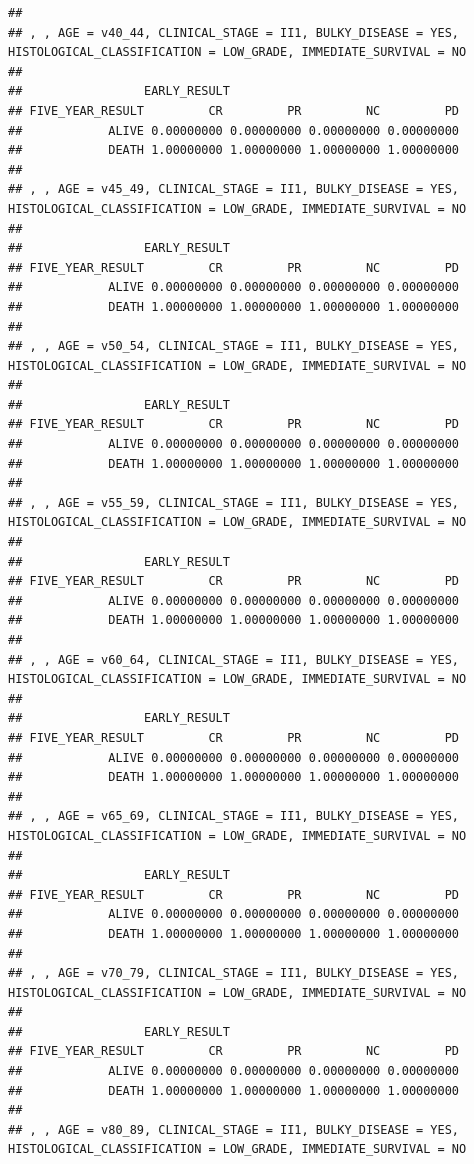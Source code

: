 \documentclass[]{article}
\begin{document}
\begin{verbatim}
## 
## , , AGE = v40_44, CLINICAL_STAGE = II1, BULKY_DISEASE = YES, HISTOLOGICAL_CLASSIFICATION = LOW_GRADE, IMMEDIATE_SURVIVAL = NO
## 
##                 EARLY_RESULT
## FIVE_YEAR_RESULT         CR         PR         NC         PD
##            ALIVE 0.00000000 0.00000000 0.00000000 0.00000000
##            DEATH 1.00000000 1.00000000 1.00000000 1.00000000
## 
## , , AGE = v45_49, CLINICAL_STAGE = II1, BULKY_DISEASE = YES, HISTOLOGICAL_CLASSIFICATION = LOW_GRADE, IMMEDIATE_SURVIVAL = NO
## 
##                 EARLY_RESULT
## FIVE_YEAR_RESULT         CR         PR         NC         PD
##            ALIVE 0.00000000 0.00000000 0.00000000 0.00000000
##            DEATH 1.00000000 1.00000000 1.00000000 1.00000000
## 
## , , AGE = v50_54, CLINICAL_STAGE = II1, BULKY_DISEASE = YES, HISTOLOGICAL_CLASSIFICATION = LOW_GRADE, IMMEDIATE_SURVIVAL = NO
## 
##                 EARLY_RESULT
## FIVE_YEAR_RESULT         CR         PR         NC         PD
##            ALIVE 0.00000000 0.00000000 0.00000000 0.00000000
##            DEATH 1.00000000 1.00000000 1.00000000 1.00000000
## 
## , , AGE = v55_59, CLINICAL_STAGE = II1, BULKY_DISEASE = YES, HISTOLOGICAL_CLASSIFICATION = LOW_GRADE, IMMEDIATE_SURVIVAL = NO
## 
##                 EARLY_RESULT
## FIVE_YEAR_RESULT         CR         PR         NC         PD
##            ALIVE 0.00000000 0.00000000 0.00000000 0.00000000
##            DEATH 1.00000000 1.00000000 1.00000000 1.00000000
## 
## , , AGE = v60_64, CLINICAL_STAGE = II1, BULKY_DISEASE = YES, HISTOLOGICAL_CLASSIFICATION = LOW_GRADE, IMMEDIATE_SURVIVAL = NO
## 
##                 EARLY_RESULT
## FIVE_YEAR_RESULT         CR         PR         NC         PD
##            ALIVE 0.00000000 0.00000000 0.00000000 0.00000000
##            DEATH 1.00000000 1.00000000 1.00000000 1.00000000
## 
## , , AGE = v65_69, CLINICAL_STAGE = II1, BULKY_DISEASE = YES, HISTOLOGICAL_CLASSIFICATION = LOW_GRADE, IMMEDIATE_SURVIVAL = NO
## 
##                 EARLY_RESULT
## FIVE_YEAR_RESULT         CR         PR         NC         PD
##            ALIVE 0.00000000 0.00000000 0.00000000 0.00000000
##            DEATH 1.00000000 1.00000000 1.00000000 1.00000000
## 
## , , AGE = v70_79, CLINICAL_STAGE = II1, BULKY_DISEASE = YES, HISTOLOGICAL_CLASSIFICATION = LOW_GRADE, IMMEDIATE_SURVIVAL = NO
## 
##                 EARLY_RESULT
## FIVE_YEAR_RESULT         CR         PR         NC         PD
##            ALIVE 0.00000000 0.00000000 0.00000000 0.00000000
##            DEATH 1.00000000 1.00000000 1.00000000 1.00000000
## 
## , , AGE = v80_89, CLINICAL_STAGE = II1, BULKY_DISEASE = YES, HISTOLOGICAL_CLASSIFICATION = LOW_GRADE, IMMEDIATE_SURVIVAL = NO

\end{verbatim}
\end{document}
